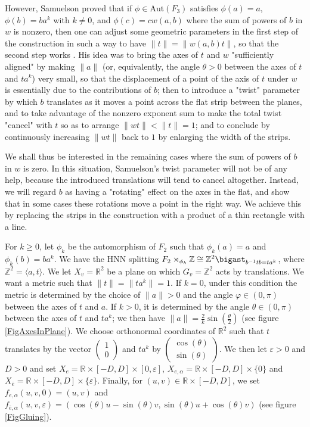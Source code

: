 \documentclass  [a4paper, 11pts] {article}
\newcommand{\R}{\mathbb{R}}
\newcommand{\Z}{\mathbb{Z}}
\newcommand{\eps}{\varepsilon}
\newcommand{\Aut}{{\mathrm{Aut}}}
\begin{document}
However, Samuelson proved that if $\phi\in \Aut(F_3)$ satisfies $\phi(a)=a$, $\phi(b) = ba^k$ with $k\ne 0$, and $\phi(c) = cw(a, b)$ where the sum of powers of $b$ in $w$ is nonzero, then one can adjust some geometric parameters in the first step of the construction in such a way to have $\|t\| = \|w(a,b)t\|$, so that the second step works \cite{Sam06}. His idea was to bring the axes of $t$ and $w$ "sufficiently aligned" by making $\|a\|$ (or, equivalently, the angle $\theta > 0$ between the axes of $t$ and $ta^k$) very small, so that the displacement of a point of the axis of $t$ under $w$ is essentially due to the contributions of $b$; then to introduce a "twist" parameter by which $b$ translates as it moves a point across the flat strip between the planes, and to take advantage of the nonzero exponent sum to make the total twist "cancel" with $t$ so as to arrange $\|wt\| < \|t\| = 1$; and to conclude by continuously increasing $\|wt\|$ back to $1$ by enlarging the width of the strips.

We shall thus be interested in the remaining cases where the sum of powers of $b$ in $w$ is zero. In this situation, Samuelson's twist parameter will not be of any help, because the introduced translations will tend to cancel altogether. Instead, we will regard $b$ as having a "rotating" effect on the axes in the flat, and show that in some cases these rotations move a point in the right way. We achieve this by replacing the strips in the construction with a product of a thin rectangle with a line.

For $k \ge 0$, let $\phi_k$ be the automorphism of $F_2$ such that $\phi_k(a)=a$ and $\phi_k(b)=ba^k$. We have the HNN splitting $F_2\rtimes_{\phi_k}\Z \cong \Z^2 \bigast_{b^{-1}tb=ta^k}$, where $\Z^2 = \langle a, t\rangle$. We let $X_v = \R^2$ be a plane on which $G_v = \Z^2$ acts by translations. We want a metric such that $\|t\| = \|ta^k\| = 1$. If $k=0$, under this condition the metric is determined by the choice of $\|a\| > 0$ and the angle $\varphi\in (0, \pi)$ between the axes of $t$ and $a$. If $k>0$, it is determined by the angle $\theta\in (0, \pi)$ between the axes of $t$ and $ta^k$; we then have $\|a\| = \frac{2}{k}\sin(\frac{\theta}{2})$ (see figure \ref{FigAxesInPlane}). We choose orthonormal coordinates of $\R^2$ such that $t$ translates by the vector $\begin{pmatrix} 1 \\ 0 \end{pmatrix}$ and $ta^k$ by $\begin{pmatrix} \cos(\theta) \\ \sin(\theta) \end{pmatrix}$. We then let $\eps > 0$ and $D > 0$ and set $X_e = \R\times [-D, D]\times [0, \eps]$, $X_{e,\alpha} = \R\times[-D, D]\times\{0\}$ and $X_{\bar{e}} = \R\times[-D, D]\times\{\eps\}$. Finally, for $(u, v)\in \R\times[-D, D]$, we set $f_{e, \alpha}(u, v, 0) = (u, v)$ and $f_{\bar{e}, \alpha}(u, v, \eps) = (\cos(\theta)u-\sin(\theta)v, \sin(\theta)u + \cos(\theta) v)$ (see figure \ref{FigGluing}).
\end{document}
